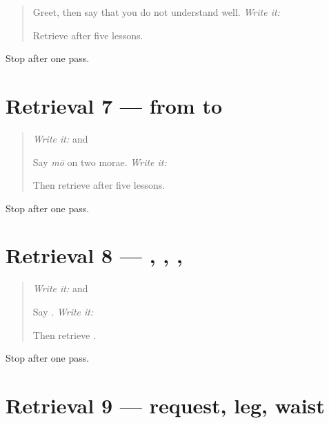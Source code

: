 \begin{quote}
Greet, then say that you do not understand well. \emph{Write it:} \textbf{}

Retrieve \textbf{} after five lessons.
\end{quote}

\begin{tcolorbox}[breakable,colback=teal!4,colframe=teal!35!black,title={Before you move on}]
Stop after one pass.
\end{tcolorbox}
\section[Practice]{Retrieval 7 — from  to }

\label{lesson:JA-R12-repair-02}



\begin{quote}
\emph{Write it:} \textbf{} and \textbf{}

Say \emph{mō} on two morae. \emph{Write it:} \textbf{}

Then retrieve \textbf{} after five lessons.
\end{quote}

\begin{tcolorbox}[breakable,colback=teal!4,colframe=teal!35!black,title={Before you move on}]
Stop after one pass.
\end{tcolorbox}
\section[Practice]{Retrieval 8 — , , , }

\label{lesson:JA-R12-repair-03}



\begin{quote}
\emph{Write it:} \textbf{} and \textbf{}

Say \textbf{}. \emph{Write it:} \textbf{}

Then retrieve \textbf{}.
\end{quote}

\begin{tcolorbox}[breakable,colback=teal!4,colframe=teal!35!black,title={Before you move on}]
Stop after one pass.
\end{tcolorbox}
\section[Practice]{Retrieval 9 — request, leg, waist}

